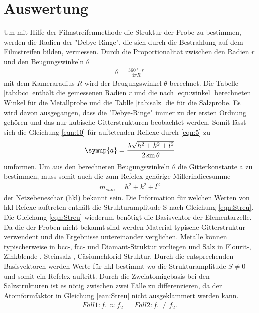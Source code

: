 \section{Auswertung}
\label{sec:Auswertung}

Um mit Hilfe der Filmstreifenmethode die Struktur der Probe zu bestimmen, werden
die Radien der "Debye-Ringe", die sich durch die Bestrahlung auf dem Filmstreifen bilden,
vermessen. Durch die Proportionalität zwischen den Radien $r$ und den Beugungswinkeln $\theta$
\begin{align}
\theta=\frac{\SI{360}{\degree}\cdot r}{4 \pi R } \label{eqn:winkel}
\end{align}
mit dem Kameraradius $R$ wird der Beugungswinkel $\theta$ berechnet.
Die Tabelle \ref{tab:bcc} enthält die gemessenen Radien $r$ und die nach \ref{eqn:winkel} berechneten Winkel
für die Metallprobe und die Tablle \ref{tab:salz} die für die Salzprobe.
Es wird davon ausgegangen, dass die "Debye-Ringe" immer zu der ersten Ordnung gehören
und das nur kubische Gitterstrukturen beobachtet werden.
Somit lässt sich die Gleichung \ref{eqn:10} für auftetenden
Reflexe durch \eqref{eqn:5} zu
\begin{align}
\symup{a} = \frac{\lambda \sqrt{h^2 +k^2+l^2}}{2\sin{\theta}} \label{eqn:Gitterkonst}
\end{align}
umformen.
Um aus den berechneten Beugungswinkeln $\theta$ die Gitterkonstante a
zu bestimmen, muss somit auch die zum Refelex gehörige Millerindicesumme
\begin{align*}
  m_{sum}=h^{2} + k^{2} + l^{2}
\end{align*}
der Netzebeneschar (hkl) bekannt sein.
Die Information für welchen Werten von hkl Refexe auftreten
enthält die Strukturamplitude S nach Gleichung \eqref{eqn:Streu}.
Die Gleichung \eqref{eqn:Streu} wiederum benötigt die Basisvektor
der Elementarzelle. Da die der Proben nicht bekannt sind werden
Material typische Gitterstruktur verwendent und die Ergebnisse
untereinander verglichen. Metalle können typischerweise in
 bcc-, fcc- und Diamant-Struktur
vorliegen und Salz in Flourit-, Zinkblende-,
Steinsalz-, Cäsiumchlorid-Struktur.
Durch die entsprechenden Basisvektoren
werden Werte für hkl bestimmt wo die Strukturamplitude
$S\neq0$ und somit ein Refelex auftritt.
Durch die Zweiatomigebasis bei den
Salzstrukturen ist es nötig zwischen zwei Fälle zu differenzieren,
da der Atomformfaktor in Gleichung
\eqref{ean:Streu} nicht ausgeklammert werden kann.
\begin{align*}
  Fall 1: f_1\approx f_2  & & Fall 2: f_1\neq f_2.
\end{align*}
